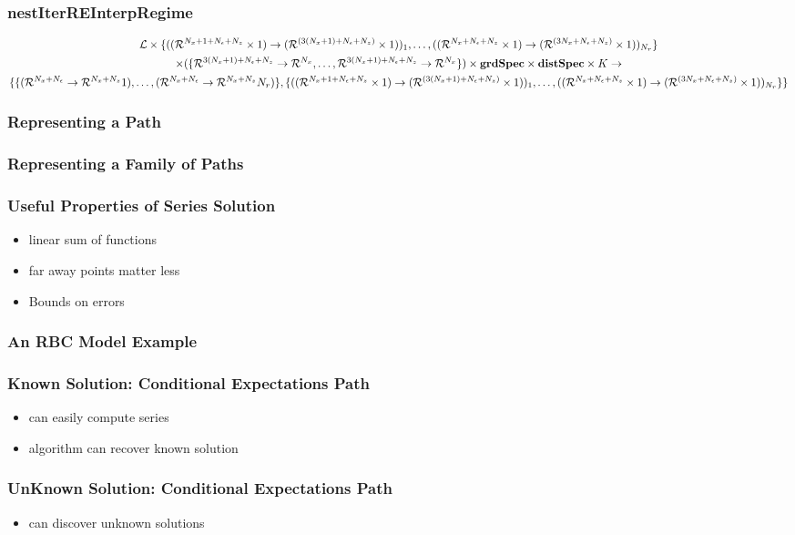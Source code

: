 \documentclass[tikz]{beamer}
\begin{document}
\begin{frame}
\frametitle{nestIterREInterpRegime}
\label{sec:nestiterreinterp}



\begin{gather*}
  \linMod \times 
\{(\lilXRegimeFuncSig)_1,\ldots,(\xzFuncGuessSig)_{\numR}\}  \\
 \times (\eqnRegimeFuncSig ) \times \grdSpec \times \dstSpec  \times \numIters \rightarrow\\
\{\frfpnsRegimeFuncSig, \{(\lilXRegimeFuncSig)_1,\ldots,(\xzFuncGuessSig)_{\numR}\}\}
\end{gather*}


\end{frame}
\begin{frame}
\frametitle{Representing a Path}

\end{frame}
\begin{frame}
\frametitle{Representing a Family of Paths}

\end{frame}
\begin{frame}
\frametitle{Useful Properties of Series Solution}

\begin{itemize}
\item linear sum of functions
\item far away points matter less
\item Bounds on errors
\end{itemize}



\end{frame}
\begin{frame}
\frametitle{An RBC Model Example}
\end{frame}
\begin{frame}
\frametitle{Known Solution: Conditional Expectations Path}
\begin{itemize}
\item can easily compute series
\item algorithm can recover known solution
\end{itemize}


\end{frame}
\begin{frame}
\frametitle{UnKnown Solution: Conditional Expectations Path}
\begin{itemize}
\item can discover unknown solutions
\end{itemize}



\end{frame}
\end{document}
